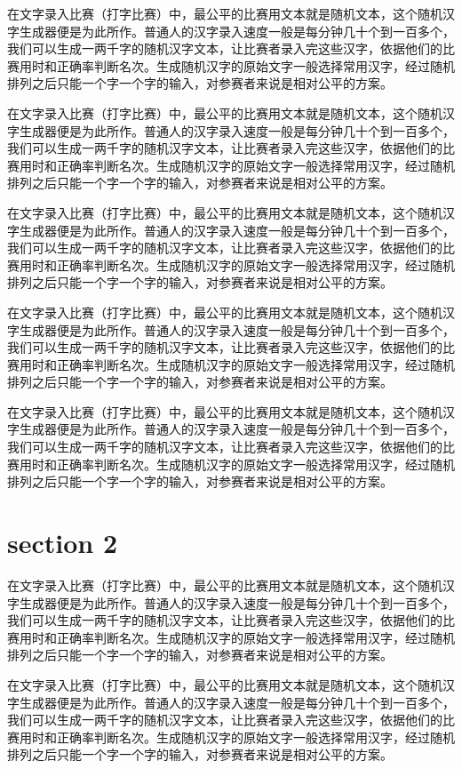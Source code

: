 \documentclass[12pt,hyperref,UTF8]{ctexbook}
\begin{document}
在文字录入比赛（打字比赛）中，最公平的比赛用文本就是随机文本，这个随机汉字生成器便是为此所作。普通人的汉字录入速度一般是每分钟几十个到一百多个，我们可以生成一两千字的随机汉字文本，让比赛者录入完这些汉字，依据他们的比赛用时和正确率判断名次。生成随机汉字的原始文字一般选择常用汉字，经过随机排列之后只能一个字一个字的输入，对参赛者来说是相对公平的方案。

在文字录入比赛（打字比赛）中，最公平的比赛用文本就是随机文本，这个随机汉字生成器便是为此所作。普通人的汉字录入速度一般是每分钟几十个到一百多个，我们可以生成一两千字的随机汉字文本，让比赛者录入完这些汉字，依据他们的比赛用时和正确率判断名次。生成随机汉字的原始文字一般选择常用汉字，经过随机排列之后只能一个字一个字的输入，对参赛者来说是相对公平的方案。

在文字录入比赛（打字比赛）中，最公平的比赛用文本就是随机文本，这个随机汉字生成器便是为此所作。普通人的汉字录入速度一般是每分钟几十个到一百多个，我们可以生成一两千字的随机汉字文本，让比赛者录入完这些汉字，依据他们的比赛用时和正确率判断名次。生成随机汉字的原始文字一般选择常用汉字，经过随机排列之后只能一个字一个字的输入，对参赛者来说是相对公平的方案。

在文字录入比赛（打字比赛）中，最公平的比赛用文本就是随机文本，这个随机汉字生成器便是为此所作。普通人的汉字录入速度一般是每分钟几十个到一百多个，我们可以生成一两千字的随机汉字文本，让比赛者录入完这些汉字，依据他们的比赛用时和正确率判断名次。生成随机汉字的原始文字一般选择常用汉字，经过随机排列之后只能一个字一个字的输入，对参赛者来说是相对公平的方案。

在文字录入比赛（打字比赛）中，最公平的比赛用文本就是随机文本，这个随机汉字生成器便是为此所作。普通人的汉字录入速度一般是每分钟几十个到一百多个，我们可以生成一两千字的随机汉字文本，让比赛者录入完这些汉字，依据他们的比赛用时和正确率判断名次。生成随机汉字的原始文字一般选择常用汉字，经过随机排列之后只能一个字一个字的输入，对参赛者来说是相对公平的方案。

\section{section 2}

在文字录入比赛（打字比赛）中，最公平的比赛用文本就是随机文本，这个随机汉字生成器便是为此所作。普通人的汉字录入速度一般是每分钟几十个到一百多个，我们可以生成一两千字的随机汉字文本，让比赛者录入完这些汉字，依据他们的比赛用时和正确率判断名次。生成随机汉字的原始文字一般选择常用汉字，经过随机排列之后只能一个字一个字的输入，对参赛者来说是相对公平的方案。

在文字录入比赛（打字比赛）中，最公平的比赛用文本就是随机文本，这个随机汉字生成器便是为此所作。普通人的汉字录入速度一般是每分钟几十个到一百多个，我们可以生成一两千字的随机汉字文本，让比赛者录入完这些汉字，依据他们的比赛用时和正确率判断名次。生成随机汉字的原始文字一般选择常用汉字，经过随机排列之后只能一个字一个字的输入，对参赛者来说是相对公平的方案。

\backmatter
\end{document}
